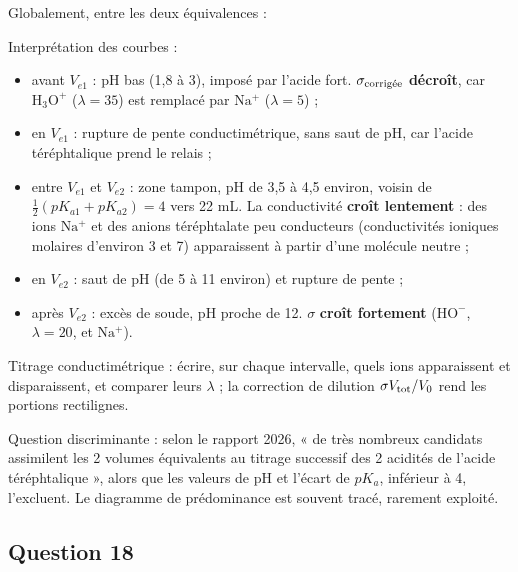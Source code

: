 \documentclass[11pt,a4paper]{article}
\providecommand{\tightlist}{\setlength{\itemsep}{0pt}\setlength{\parskip}{0pt}}
\newcommand{\equationajustee}[1]{%
  \sbox{\boiteequation}{$\displaystyle #1$}%
  \ifdim\wd\boiteequation>\linewidth
    \[\resizebox{\linewidth}{!}{\usebox{\boiteequation}}\]%
  \else
    \[#1\]%
  \fi}
\begin{document}
Globalement, entre les deux équivalences :

\equationajustee{\mathrm{BDCH_2}+2\,\mathrm{HO^-}\longrightarrow\mathrm{BDC^{2-}}+2\,\mathrm{H_2O}}

Interprétation des courbes :

\begin{itemize}
\tightlist
\item
  avant \(V_{e1}\) : pH bas (1,8 à 3), imposé par l'acide fort. \(\sigma_{\rm \text{corrigée}}\) \textbf{décroît}, car \(\mathrm{H_3O^+}\) (\(\lambda=35\)) est remplacé par \(\mathrm{Na^+}\) (\(\lambda=5\)) ;
\item
  en \(V_{e1}\) : rupture de pente conductimétrique, sans saut de pH, car l'acide téréphtalique prend le relais ;
\item
  entre \(V_{e1}\) et \(V_{e2}\) : zone tampon, pH de 3,5 à 4,5 environ, voisin de \(\frac12(pK_{a1}+pK_{a2})=4\) vers 22 mL. La conductivité \textbf{croît lentement} : des ions \(\mathrm{Na^+}\) et des anions téréphtalate peu conducteurs (conductivités ioniques molaires d'environ 3 et 7) apparaissent à partir d'une molécule neutre ;
\item
  en \(V_{e2}\) : saut de pH (de 5 à 11 environ) et rupture de pente ;
\item
  après \(V_{e2}\) : excès de soude, pH proche de 12. \(\sigma\) \textbf{croît fortement} (\(\mathrm{HO^-}\), \(\lambda=20\), et \(\mathrm{Na^+}\)).
\end{itemize}

\begin{methode}

Titrage conductimétrique : écrire, sur chaque intervalle, quels ions apparaissent et disparaissent, et comparer leurs \(\lambda\) ; la correction de dilution \(\sigma V_{\rm tot}/V_0\) rend les portions rectilignes.

\end{methode}

\begin{piege}

Question discriminante : selon le rapport 2026, « de très nombreux candidats assimilent les 2 volumes équivalents au titrage successif des 2 acidités de l'acide téréphtalique », alors que les valeurs de pH et l'écart de \(pK_a\), inférieur à 4, l'excluent. Le diagramme de prédominance est souvent tracé, rarement exploité.

\end{piege}

\hypertarget{question-18}{%
\subsection{Question 18}\label{question-18}}
\end{document}
